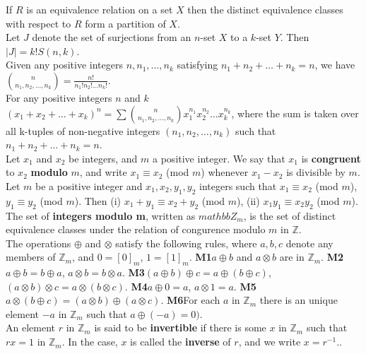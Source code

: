 \documentclass[10pt,landscape]{article}
\begin{document}
\begin{multicols}{3}
If $R$ is an equivalence relation on a set $X$ then the distinct
equivalence classes with respect to $R$ form a partition of $X$.\\
Let $J$ denote the set of surjections from an $n$-set $X$ to a $k$-set
$Y$. Then $|J| = k!S(n,k)$.\\
Given any positive integers $n, n_{1}, \dots ,n_{k}$ satisfying
$n_{1} + n_{2} + \dots + n_{k} = n$, we have
$\binom{n}{n_{1},n_{2},\dots,n_{k}}=\frac{n!}{n_{1}!n_{2}!\dots
  n_{k}!}$.\\
For any positive integers $n$ and $k$ $(x_{1}+ x_{2} + \dots
+ x_{k})^{n} = \sum \binom{n}{n_{1},n_{2}, \dots
  ,n_{k}} x_{1}^{n_{1}} x_{2}^{n_{2}} \dots x_{k}^{n_{k}}$, where the sum
    is taken over all k-tuples of non-negative integers $(n_{1},
    n_{2}, \dots, n_{k})$ such that $n_{1}+n_{2}+ \dots + n_{k} = n$.\\   
Let $x_{1}$ and $x_{2}$ be integers, and $m$ a positive integer. We
say that $x_{1}$ is \textbf{congruent} to $x_{2}$ \textbf{modulo} $m$,
and write $x_{1} \equiv x_{2}$ (mod $m$) whenever $x_{1} - x_{2}$ is
divisible by $m$.\\
Let $m$ be a positive integer and $x_{1}, x_{2}, y_{1}, y_{2}$
integers such that $x_{1} \equiv x_{2}$ (mod $m$), $y_{1} \equiv y_{2}$
(mod $m$). Then (i) $x_{1} + y_{1} \equiv x_{2} + y_{2}$ (mod $m$), (ii)
$x_{1}y_{1} \equiv x_{2}y_{2}$ (mod $m$).\\
The set of \textbf{integers modulo m}, written as $mathbb{Z}_{m}$, is
the set of distinct equivalence classes under the relation of
congurence modulo $m$ in $\mathbb{Z}$.\\
The operations $\oplus$ and $\otimes$ satisfy the following rules,
where $a,b,c$ denote any members of $\mathbb{Z}_{m}$, and $0
= [0]_{m}$, $1 = [1]_{m}$.
\textbf{M1}$a \oplus b$ and $a \otimes b$ are in $\mathbb{Z}_{m}$.
\textbf{M2}$a \oplus b = b \oplus a$, $a \otimes b = b \otimes a$.
\textbf{M3}$(a \oplus b) \oplus c = a \oplus (b \oplus c)$, $(a
\otimes b) \otimes c = a \otimes (b \otimes c)$.
\textbf{M4}$a \oplus 0 = a$, $a \otimes 1 = a$.
\textbf{M5}$a \otimes (b \oplus c) = (a \otimes b) \oplus (a \otimes c)$.
\textbf{M6}For each $a$ in $\mathbb{Z}_{m}$ there is  an unique
element $-a$ in $\mathbb{Z}_{m}$ such that $a \oplus(-a) = 0)$.\\
An element $r$ in $\mathbb{Z}_{m}$ is said to be \textbf{invertible}
if there is some $x$ in $\mathbb{Z}_{m}$ such that $rx = 1$ in
$\mathbb{Z}_{m}$. In the case, $x$ is called the \textbf{inverse} of
$r$, and we write $x = r^{-1}.$.\\

\end{multicols}
\end{document}
